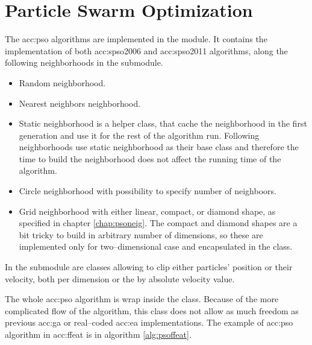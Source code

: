 \section{Particle Swarm Optimization}

The \acrlong{acc:pso} algorithms are implemented in the  module. It contains the implementation of both \acrshort{acc:spso2006} and \acrshort{acc:spso2011} algorithms, along the following neighborhoods in the  submodule.
\begin{itemize}
    \item Random neighborhood.
    \item Nearest neighbors neighborhood.
    \item Static neighborhood is a helper class, that cache the neighborhood in the first generation and use it for the rest of the algorithm run. Following neighborhoods use static neighborhood as their base class and therefore the time to build the neighborhood does not affect the running time of the algorithm.
    \item Circle neighborhood with possibility to specify number of neighboors.
    \item Grid neighborhood with either linear, compact, or diamond shape, as specified in chapter \ref{chap:psoneig}. The compact and diamond shapes are a bit tricky to build in arbitrary number of dimensions, so these are implemented only for two--dimensional case and encapsulated in the  class.
\end{itemize}

In the  submodule are classes allowing to clip either particles' position or their velocity, both per dimension or the by absolute velocity value.

The whole \acrshort{acc:pso} algorithm is wrap inside the  class. Because of the more complicated flow of the algorithm, this class does not allow as much freedom as previous \acrshort{acc:ga} or real--coded \acrshort{acc:ea} implementations. The example of \acrshort{acc:pso} algorithm in \acrshort{acc:ffeat} is in algorithm \ref{alg:psoffeat}.

